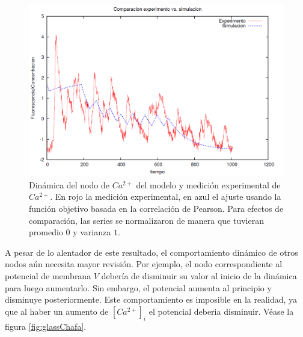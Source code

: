 \begin{figure}[h]
\includegraphics[width=0.9\linewidth]{gfx/glassChido}
\caption[Dinámica del nodo de $Ca^{2+}$ del modelo y medición experimental de $Ca^{2+}$]{Dinámica del nodo de $Ca^{2+}$ del modelo y medición experimental de $Ca^{2+}$. En rojo la medición experimental, en azul el ajuste usando la función objetivo basada en la correlación de Pearson. Para efectos de comparación, las series se normalizaron de manera que tuvieran promedio $0$ y varianza $1$.}\label{fig:glassChido}
\end{figure}

A pesar de lo alentador de este resultado, el comportamiento dinámico de otros nodos aún necesita mayor revisión. Por ejemplo, el nodo correspondiente al potencial de membrana $V$ debería de disminuir su valor al inicio de la dinámica para luego aumentarlo. Sin embargo, el potencial aumenta al principio y disminuye posteriormente. Este comportamiento es imposible en la realidad, ya que al haber un aumento de $[Ca^{2+}]_i$ el potencial deberia disminuir. Véase la figura \ref{fig:glassChafa}.

